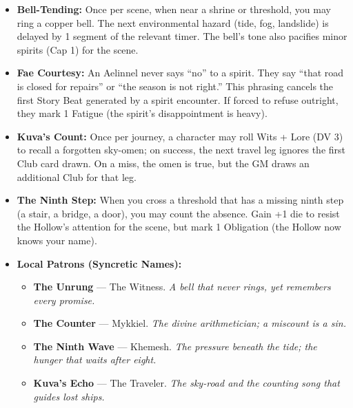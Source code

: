 \begin{itemize}
\item \textbf{Bell-Tending:} Once per scene, when near a shrine or threshold, you may ring a copper bell. The next environmental hazard (tide, fog, landslide) is delayed by 1 segment of the relevant timer. The bell's tone also pacifies minor spirits (Cap 1) for the scene.
\item \textbf{Fae Courtesy:} An Aelinnel never says ``no'' to a spirit. They say ``that road is closed for repairs'' or ``the season is not right.'' This phrasing cancels the first Story Beat generated by a spirit encounter. If forced to refuse outright, they mark 1 Fatigue (the spirit's disappointment is heavy).
\item \textbf{Kuva's Count:} Once per journey, a character may roll Wits + Lore (DV 3) to recall a forgotten sky-omen; on success, the next travel leg ignores the first Club card drawn. On a miss, the omen is true, but the GM draws an additional Club for that leg.
\item \textbf{The Ninth Step:} When you cross a threshold that has a missing ninth step (a stair, a bridge, a door), you may count the absence. Gain +1 die to resist the Hollow's attention for the scene, but mark 1 Obligation (the Hollow now knows your name).
\item \textbf{Local Patrons (Syncretic Names):}
  \begin{itemize}
    \item \textbf{The Unrung} --- The Witness. \textit{A bell that never rings, yet remembers every promise.}
    \item \textbf{The Counter} --- Mykkiel. \textit{The divine arithmetician; a miscount is a sin.}
    \item \textbf{The Ninth Wave} --- Khemesh. \textit{The pressure beneath the tide; the hunger that waits after eight.}
    \item \textbf{Kuva's Echo} --- The Traveler. \textit{The sky-road and the counting song that guides lost ships.}
  \end{itemize}
\end{itemize}

